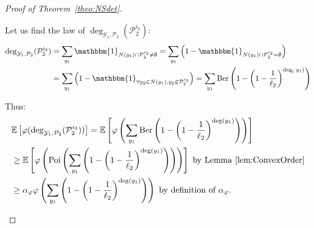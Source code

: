 \begin{proof}[Proof of Theorem~\ref{theo:NSdet}]
\begin{enumerate}
Let us find the law of $\deg_{\mathcal{Y}_1,\mathcal{P}_2}(\mathcal{P}_2^{i_2})$:
  \begin{equation}
    \begin{aligned}
      \deg_{\mathcal{Y}_1,\mathcal{P}_2}(\mathcal{P}_2^{i_2}) &= \sum_{y_1} \mathbbm{1}_{N(y_1) \cap \mathcal{P}_2^{i_2} \not= \emptyset} = \sum_{y_1} \left(1-\mathbbm{1}_{N(y_1) \cap \mathcal{P}_2^{i_2} = \emptyset}\right)\\
      &= \sum_{y_1} \left(1-\mathbbm{1}_{\forall y_2 \in N(y_1), y_2 \not\in \mathcal{P}_2^{i_2}}\right) = \sum_{y_1} \Ber\left(1-\left(1-\frac{1}{\ell_2}\right)^{\deg_(y_1)}\right)
    \end{aligned}
  \end{equation}

Thus:
\begin{equation}
  \begin{aligned}
    &\mathbb{E}\left[\varphi(\deg_{\mathcal{Y}_1,\mathcal{P}_2}(\mathcal{P}_2^{i_2}))\right] = \mathbb{E}\left[\varphi\left(\sum_{y_1}\operatorname{\text{Ber}}\left(1-\left(1-\frac{1}{\ell_2}\right)^{\deg(y_1)}\right)\right)\right]\\
    &\geq  \mathbb{E}\left[\varphi\left(\operatorname{\text{Poi}}\left(\sum_{y_1}\left(1-\left(1-\frac{1}{\ell_2}\right)^{\deg(y_1)}\right)\right)\right)\right] \text{ by Lemma~\ref{lem:ConvexOrder}}\\
    &\geq \alpha_{\varphi}\varphi\left(\sum_{y_1}\left(1-\left(1-\frac{1}{\ell_2}\right)^{\deg(y_1)}\right)\right) \text{ by definition of $\alpha_{\varphi}$.}
  \end{aligned}
\end{equation}


\end{enumerate}
\end{proof}
